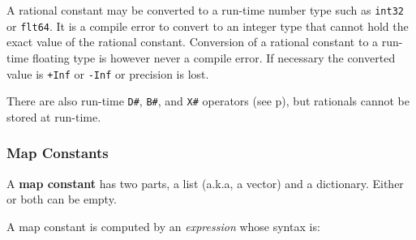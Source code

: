 \documentclass[12pt]{article}
\newcommand{\key}[1]{{\rm \bfseries #1}}
\newcommand{\pagref}[1]{p\pageref{#1}}
\begin{document}
A rational constant may be converted to a run-time number
type such as {\tt int32} or {\tt flt64}.
It is a compile error to convert to an integer type that cannot
hold the exact value of the rational constant.
Conversion of a rational constant
to a run-time floating type is however
never a compile error.  If necessary the converted value is
{\tt +Inf} or {\tt -Inf} or precision is lost.

There are also run-time {\tt D\#}, {\tt B\#}, and {\tt X\#}
operators (see \pagref{RUN-TIME-STRING-TO-NUMBER-CONVERSIONS}),
but rationals cannot be stored at run-time.

\subsubsection{Map Constants}
\label{MAP-CONSTANTS}

A \key{map constant} has two parts, a list (a.k.a, a vector) and a dictionary.
Either or both can be empty.

A map constant is computed by an {\em expression} whose syntax is:
\end{document}
